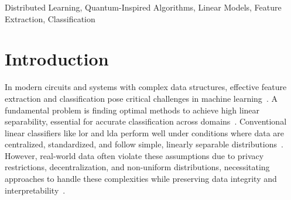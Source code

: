 \documentclass[conference]{IEEEtran}
\begin{document}
\begin{abstract}
In modern machine learning circuits and systems, the need for centralized, standardized data poses significant challenges, especially in privacy-sensitive, resource-constrained, real-time, or asynchronous environments. We introduce \Gls{eca}, a quantum-inspired linear model that circumvents these requirements by leveraging intrinsic data structures. \Gls{eca} uses an orthogonal transformation to extract meaningful features from decentralized, non-standardized data, ensuring high classification accuracy without extensive preprocessing. Unlike traditional linear models, \Gls{eca} adapts to complex data distributions and shows superior performance in feature extraction and classification across various datasets. Experiments indicate that \Gls{eca} achieves robust accuracy with fewer parameters, highlighting its potential where data centralization and standardization are impractical. Our work extends the feasibility of linear models in diverse scenarios, enhancing interpretability and efficiency in challenging data environments.
\end{abstract}



\begin{IEEEkeywords}
Distributed Learning,
Quantum-Inspired Algorithms,
Linear Models, Feature Extraction, Classification
\end{IEEEkeywords}

\section{Introduction}
In modern circuits and systems with complex data structures, effective feature extraction and classification pose critical challenges in machine learning~\cite{labrinidis2012challenges}. A fundamental problem is finding optimal methods to achieve high linear separability, essential for accurate classification across domains~\cite{hastie2009elements}. Conventional linear classifiers like \Gls{lor} and \Gls{lda} perform well under conditions where data are centralized, standardized, and follow simple, linearly separable distributions~\cite{hastie2009elements}. However, real-world data often violate these assumptions due to privacy restrictions, decentralization, and non-uniform distributions, necessitating approaches to handle these complexities while preserving data integrity and interpretability~\cite{yang2020federated,kaissis2020secure,li2021survey}.
\end{document}
